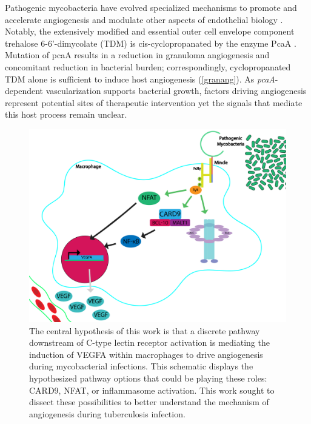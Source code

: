 Pathogenic mycobacteria have evolved specialized mechanisms to promote and accelerate angiogenesis and modulate other aspects of endothelial biology \citep{Oehlers2017}. Notably, the extensively modified and essential outer cell envelope component trehalose 6\hyp{}6'\hyp{}dimycolate (TDM) is cis\hyp{}cyclopropanated by the enzyme PcaA \citep{Glickman2000, Rao2005}. Mutation of pcaA results in a reduction in granuloma angiogenesis and concomitant reduction in bacterial burden; correspondingly, cyclopropanated TDM alone is sufficient to induce host angiogenesis \citep{Saita2000, Sakaguchi2000, Walton2018} (\autoref{granang}). As \textit{pcaA}\hyp{}dependent vascularization supports bacterial growth, factors driving angiogenesis represent potential sites of therapeutic intervention yet the signals that mediate this host process remain unclear.

\begin{figure}
\centering
\includegraphics[width=\textwidth]{images/intro_schematic.pdf}
\caption{The central hypothesis of this work is that a discrete pathway downstream of C\hyp{}type lectin receptor activation is mediating the induction of VEGFA within macrophages to drive angiogenesis during mycobacterial infections. This schematic displays the hypothesized pathway options that could be playing these roles: CARD9, NFAT, or inflammasome activation. This work sought to dissect these possibilities to better understand the mechanism of angiogenesis during tuberculosis infection.}
\label{figure:beginschematic}
\end{figure}


